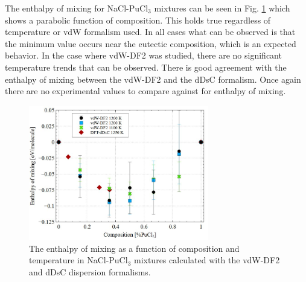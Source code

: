 \documentclass[review]{elsarticle}
\begin{document}
The enthalpy of mixing for NaCl-PuCl$_3$ mixtures can be seen in Fig. \ref{fig:mixing} which shows a parabolic function of composition. This holds true regardless of temperature or vdW formalism used. In all cases what can be observed is that the minimum value occurs near the eutectic composition, which is an expected behavior. In the case where vdW-DF2 was studied, there are no significant temperature trends that can be observed. There is good agreement with the enthalpy of mixing between the vdW-DF2 and the dDsC formalism. Once again there are no experimental values to compare against for enthalpy of mixing.

\begin{figure}[h!]
 \centering
 \includegraphics[width=0.7\textwidth]{mixing.jpg} 
 \caption{The enthalpy of mixing as a function of composition and temperature in NaCl-PuCl$_3$ mixtures calculated with the vdW-DF2 and dDsC dispersion formalisms.}
 \label{fig:mixing}
\end{figure} 


\FloatBarrier
\end{document}
